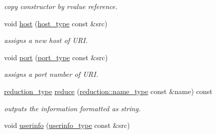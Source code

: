 \begin{DoxyCompactItemize}
\begin{DoxyCompactList}\small\item\em copy constructor by rvalue reference. \end{DoxyCompactList}\item 
\hypertarget{classhryky_1_1uri_1_1authority_1_1_entity_af074e3465603ca1dbc578ca1ea34250e}{void \hyperlink{classhryky_1_1uri_1_1authority_1_1_entity_af074e3465603ca1dbc578ca1ea34250e}{host} (\hyperlink{classhryky_1_1uri_1_1host_1_1_entity}{host\-\_\-type} const \&src)}\label{classhryky_1_1uri_1_1authority_1_1_entity_af074e3465603ca1dbc578ca1ea34250e}

\begin{DoxyCompactList}\small\item\em assigns a new host of U\-R\-I. \end{DoxyCompactList}\item 
\hypertarget{classhryky_1_1uri_1_1authority_1_1_entity_aebfd672c31b04cf9a03b346833eb9425}{void \hyperlink{classhryky_1_1uri_1_1authority_1_1_entity_aebfd672c31b04cf9a03b346833eb9425}{port} (\hyperlink{classhryky_1_1uri_1_1port_1_1_entity}{port\-\_\-type} const \&src)}\label{classhryky_1_1uri_1_1authority_1_1_entity_aebfd672c31b04cf9a03b346833eb9425}

\begin{DoxyCompactList}\small\item\em assigns a port number of U\-R\-I. \end{DoxyCompactList}\item 
\hypertarget{classhryky_1_1uri_1_1authority_1_1_entity_aef5d2bf58a4db5254757eda09dc69cdb}{\hyperlink{namespacehryky_a343a9a4c36a586be5c2693156200eadc}{reduction\-\_\-type} \hyperlink{classhryky_1_1uri_1_1authority_1_1_entity_aef5d2bf58a4db5254757eda09dc69cdb}{reduce} (\hyperlink{namespacehryky_1_1reduction_ac686c30a4c8d196bbd0f05629a6b921f}{reduction\-::name\-\_\-type} const \&name) const }\label{classhryky_1_1uri_1_1authority_1_1_entity_aef5d2bf58a4db5254757eda09dc69cdb}

\begin{DoxyCompactList}\small\item\em outputs the information formatted as string. \end{DoxyCompactList}\item 
\hypertarget{classhryky_1_1uri_1_1authority_1_1_entity_a73a2af57098eaefe6b6eff12b185a316}{void \hyperlink{classhryky_1_1uri_1_1authority_1_1_entity_a73a2af57098eaefe6b6eff12b185a316}{userinfo} (\hyperlink{classhryky_1_1uri_1_1userinfo_1_1_entity}{userinfo\-\_\-type} const \&src)}\label{classhryky_1_1uri_1_1authority_1_1_entity_a73a2af57098eaefe6b6eff12b185a316}


\end{DoxyCompactItemize}
